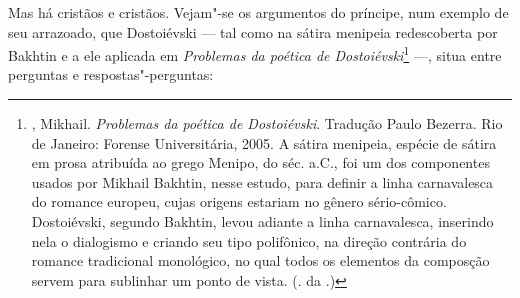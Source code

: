 Mas há cristãos e cristãos. Vejam"-se os argumentos do príncipe,
num exemplo de seu arrazoado, que Dostoiévski --- tal como na
sátira menipeia redescoberta por Bakhtin e a ele aplicada em
\emph{Problemas da poética de Dostoiévski}\footnote{, Mikhail.
\emph{Problemas da poética de Dostoiévski}. Tradução Paulo
Bezerra. Rio de Janeiro: Forense Universitária, 2005. A sátira
menipeia, espécie de sátira em prosa atribuída ao grego Menipo,
do séc. a.C., foi um dos componentes usados por
Mikhail Bakhtin, nesse estudo, para definir a linha carnavalesca
do romance europeu, cujas origens estariam no gênero sério-cômico. Dostoiévski, segundo Bakhtin, levou adiante a linha carnavalesca, inserindo nela o dialogismo e criando seu tipo polifônico, na direção contrária do romance tradicional monológico, no qual todos os elementos da composção servem para sublinhar um ponto de vista. (. da .)} ---, situa entre perguntas e respostas"-perguntas:

